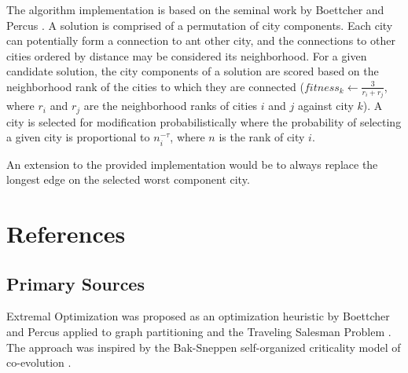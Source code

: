 \documentclass[a4paper, 11pt]{article}
\begin{document}
The algorithm implementation is based on the seminal work by Boettcher and Percus \cite{Boettcher1999}. A solution is comprised of a permutation of city components. Each city can potentially form a connection to ant other city, and the connections to other cities ordered by distance may be considered its neighborhood. For a given candidate solution, the city components of a solution are scored based on the neighborhood rank of the cities to which they are connected ($fitness_k \leftarrow \frac{3}{r_i + r_j}$, where $r_i$ and $r_j$ are the neighborhood ranks of cities $i$ and $j$ against city $k$). A city is selected for modification probabilistically where the probability of selecting a given city is proportional to $n_i^{-\tau}$, where $n$ is the rank of city $i$. 

An extension to the provided implementation would be to always replace the longest edge on the selected worst component city.




\section{References}
\label{sec:references}

% 
% 
\subsection{Primary Sources}
Extremal Optimization was proposed as an optimization heuristic by Boettcher and Percus applied to graph partitioning and the Traveling Salesman Problem \cite{Boettcher1999}. The approach was inspired by the Bak-Sneppen self-organized criticality model of co-evolution \cite{Bak1987, Bak1993}.
\end{document}
